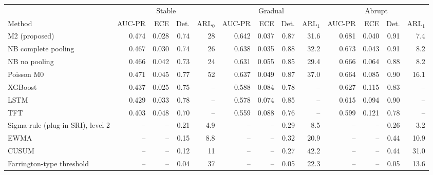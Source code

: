 \documentclass[10pt,a4paper]{article}
\begin{document}
\vspace{6pt}
\noindent\begin{minipage}{\linewidth}
\centering\scriptsize
\begin{tabular}{l*{4}{r}*{4}{r}*{4}{r}}
\toprule
 & \multicolumn{4}{c}{Stable} & \multicolumn{4}{c}{Gradual} & \multicolumn{4}{c}{Abrupt} \\
\cmidrule(lr){2-5}\cmidrule(lr){6-9}\cmidrule(lr){10-13}
Method & AUC-PR & ECE & Det. & ARL$_0$ & AUC-PR & ECE & Det. & ARL$_1$ & AUC-PR & ECE & Det. & ARL$_1$ \\ \midrule
M2 (proposed) & 0.474 & 0.028 & 0.74 & 28 & 0.642 & 0.037 & 0.87 & 31.6 & 0.681 & 0.040 & 0.91 & 7.4 \\
NB complete pooling & 0.467 & 0.030 & 0.74 & 26 & 0.638 & 0.035 & 0.88 & 32.2 & 0.673 & 0.043 & 0.91 & 8.2 \\
NB no pooling & 0.466 & 0.042 & 0.73 & 24 & 0.631 & 0.055 & 0.85 & 29.4 & 0.666 & 0.064 & 0.88 & 8.2 \\
Poisson M0 & 0.471 & 0.045 & 0.77 & 52 & 0.637 & 0.049 & 0.87 & 37.0 & 0.664 & 0.085 & 0.90 & 16.1 \\
XGBoost & 0.437 & 0.025 & 0.75 & -- & 0.588 & 0.084 & 0.78 & -- & 0.627 & 0.115 & 0.83 & -- \\
LSTM & 0.429 & 0.033 & 0.78 & -- & 0.578 & 0.074 & 0.85 & -- & 0.615 & 0.094 & 0.90 & -- \\
TFT & 0.403 & 0.048 & 0.70 & -- & 0.559 & 0.088 & 0.76 & -- & 0.599 & 0.121 & 0.78 & -- \\
Sigma-rule (plug-in SRI), level 2 & -- & -- & 0.21 & 4.9 & -- & -- & 0.29 & 8.5 & -- & -- & 0.26 & 3.2 \\
EWMA & -- & -- & 0.15 & 8.8 & -- & -- & 0.32 & 20.9 & -- & -- & 0.44 & 10.9 \\
CUSUM & -- & -- & 0.12 & 11 & -- & -- & 0.27 & 42.2 & -- & -- & 0.44 & 31.0 \\
Farrington-type threshold & -- & -- & 0.04 & 37 & -- & -- & 0.05 & 22.3 & -- & -- & 0.05 & 13.6 \\
\bottomrule
\end{tabular}
\end{minipage}
\vspace{8pt}
\end{document}
